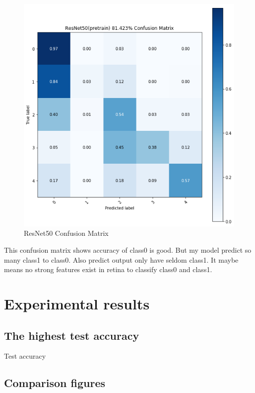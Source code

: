 \documentclass[12pt]{article}
\begin{document}
\begin{figure}[H]
\centering
\includegraphics[width=\linewidth]{Images/ResNet50CM.png}
\caption{ResNet50 Confusion Matrix}
\end{figure}

This confusion matrix shows accuracy of class0 is good. But my model predict so many class1 to class0. Also predict output only have seldom class1. It maybe means no strong features exist in retina to classify class0 and class1. 

\section{Experimental results}

\subsection{The highest test accuracy}

\par
\begin{table}[H]
    \centering
    \caption{Test accuracy}
    \label{tab:my_label}
\end{table}

\subsection{Comparison figures}
\end{document}
